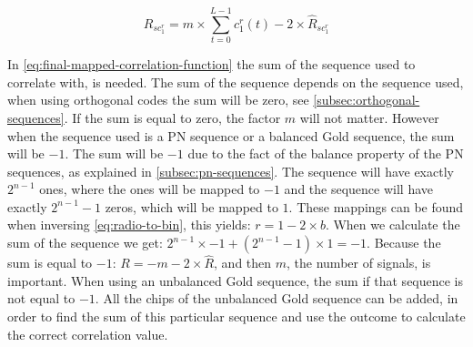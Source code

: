 \begin{equation}
	R_{sc^r_{1}} = m \times \displaystyle\sum_{t = 0} ^ {L - 1} c^r_1(t) - 2 \times \hat{R}_{sc^r_1}
	\label{eq:final-mapped-correlation-function}
\end{equation}









%


In \autoref{eq:final-mapped-correlation-function} the sum of the sequence used to correlate with, is needed. 
The sum of the sequence depends on the sequence used, when using orthogonal codes the sum will be zero, see \autoref{subsec:orthogonal-sequences}.
If the sum is equal to zero, the factor $m$ will not matter.
However when the sequence used is a PN sequence or a balanced Gold sequence, the sum will be $-1$.
The sum will be $-1$ due to the fact of the balance property of the PN sequences, as explained in \autoref{subsec:pn-sequences}.
The sequence will have exactly $2^{n-1}$ ones, where the ones will be mapped to $-1$ and the sequence will have exactly $2^{n-1} -1$ zeros, which will be mapped to $1$.
These mappings can be found when inversing \autoref{eq:radio-to-bin}, this yields: $r = 1 - 2 \times b$.
When we calculate the sum of the sequence we get: $2^{n-1} \times -1 + (2^{n-1} - 1) \times 1 = -1$.
Because the sum is equal to $-1$: $R = -m - 2 \times \hat{R}$, and then $m$, the number of signals, is important.
When using an unbalanced Gold sequence, the sum if that sequence is not equal to $-1$.
All the chips of the unbalanced Gold sequence can be added, in order to find the sum of this particular sequence and use the outcome to calculate the correct correlation value.









